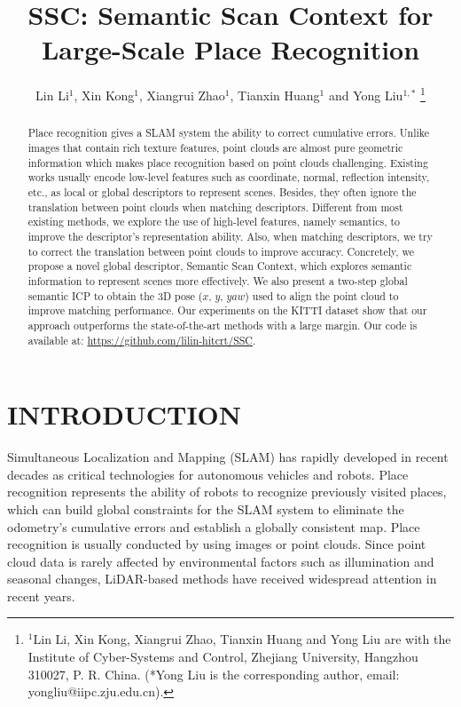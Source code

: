 \documentclass[letterpaper, 10 pt, conference]{ieeeconf}  %
\title{\LARGE \bf
SSC: Semantic Scan Context for Large-Scale Place Recognition
}
\author{Lin Li$^{1}$, Xin Kong$^{1}$, Xiangrui Zhao$^{1}$, Tianxin Huang$^{1}$ and Yong Liu$^{1,*}$%
\thanks{$^{1}$Lin Li, Xin Kong, Xiangrui Zhao, Tianxin Huang and Yong Liu are with the Institute of Cyber-Systems and Control, Zhejiang University, Hangzhou 310027, P. R. China. (*Yong Liu is the corresponding author, email: yongliu@iipc.zju.edu.cn).}
}
\begin{document}
\maketitle
\thispagestyle{empty}
\pagestyle{empty}


\begin{abstract}

Place recognition gives a SLAM system the ability to correct cumulative errors. Unlike images that contain rich texture features, point clouds are almost pure geometric information which makes place recognition based on point clouds challenging. Existing works usually encode low-level features such as coordinate, normal, reflection intensity, etc., as local or global descriptors to represent scenes. Besides, they often ignore the translation between point clouds when matching descriptors. Different from most existing methods, we explore the use of high-level features, namely semantics, to improve the descriptor's representation ability. Also, when matching descriptors, we try to correct the translation between point clouds to improve accuracy. Concretely, we propose a novel global descriptor, Semantic Scan Context, which explores semantic information to represent scenes more effectively. We also present a two-step global semantic ICP to obtain the 3D pose (\(x\), \(y\), \(yaw\)) used to align the point cloud to improve matching performance. Our experiments on the KITTI dataset show that our approach outperforms the state-of-the-art methods with a large margin. Our code is available at: \url{https://github.com/lilin-hitcrt/SSC}.

\end{abstract}


\section{INTRODUCTION}

Simultaneous Localization and Mapping (SLAM) has rapidly developed in recent decades as critical technologies for autonomous vehicles and robots. Place recognition represents the ability of robots to recognize previously visited places, which can build global constraints for the SLAM system to eliminate the odometry's cumulative errors and establish a globally consistent map\cite{4633680}. Place recognition is usually conducted by using images or point clouds. Since point cloud data is rarely affected by environmental factors such as illumination and seasonal changes, LiDAR-based methods have received widespread attention in recent years.
\end{document}
